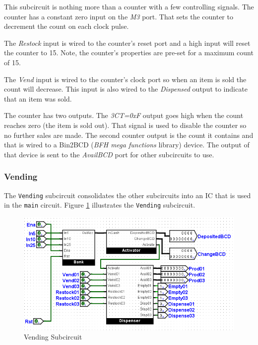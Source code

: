 This subcircuit is nothing more than a counter with a few controlling signals. The counter has a constant zero input on the \textit{M3} port. That sets the counter to decrement the count on each clock pulse.

The \textit{Restock} input is wired to the counter's reset port and a high input will reset the counter to 15. Note, the counter's properties are pre-set for a maximum count of 15.

The \textit{Vend} input is wired to the counter's clock port so when an item is sold the count will decrease. This input is also wired to the \textit{Dispensed} output to indicate that an item was sold.

The counter has two outputs. The \textit{3CT=0xF} output goes high when the count reaches zero (the item is sold out). That signal is used to disable the counter so no further sales are made. The second counter output is the count it contains and that is wired to a Bin2BCD (\textit{BFH mega functions} library) device. The output of that device is sent to the \textit{AvailBCD} port for other subcircuits to use.

\subsubsection{Vending}

The \lstinline[columns=fixed]|Vending| subcircuit consolidates the other subcircuits into an \ac{IC} that is used in the \lstinline[columns=fixed]|main| circuit. Figure \ref{fig:vend-06} illustrates the \lstinline[columns=fixed]|Vending| subcircuit.

\begin{figure}[H]
	\centering
	\includegraphics[width=\maxwidth{.95\linewidth}]{gfx/vend-06}
	\caption{Vending Subcircuit}
	\label{fig:vend-06}
\end{figure}

